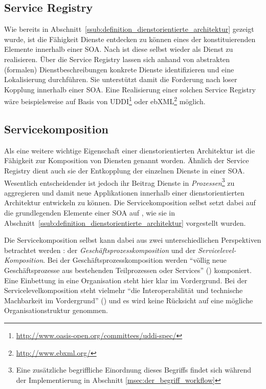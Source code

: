 \subsection{Service Registry} %
\label{sub:service_registry}

  Wie bereits in Abschnitt~\ref{ssub:definition_dienstorientierte_architektur} gezeigt wurde, ist die Fähigkeit Dienste entdecken zu können eines der konstituierenden Elemente innerhalb einer SOA. Nach \citep{service_oriented_computing} ist diese selbst wieder als Dienst zu realisieren. Über die Service Registry lassen sich anhand von abstrakten (formalen) Dienstbeschreibungen konkrete Dienste identifizieren und eine Lokalisierung durchführen. Sie unterstützt damit die Forderung nach loser Kopplung innerhalb einer SOA. Eine Realisierung einer solchen Service Registry wäre beispielsweise auf Basis von UDDI\footnote{\url{http://www.oasis-open.org/committees/uddi-spec/}} oder ebXML\footnote{\url{http://www.ebxml.org/}} möglich.


\subsection{Servicekomposition} %
\label{sub:service_komposition}

  Als eine weitere wichtige Eigenschaft einer dienstorientierten Architektur ist die Fähigkeit zur Komposition von Diensten genannt worden. Ähnlich der Service Registry dient auch sie der Entkopplung der einzelnen Dienste in einer SOA. Wesentlich entscheidender ist jedoch ihr Beitrag Dienste in \emph{Prozessen}\footnote{Eine zusätzliche begriffliche Einordnung dieses Begriffs findet sich während der Implementierung in Abschnitt \ref{msec:der_begriff_workflow}} zu aggregieren und damit neue Applikationen innerhalb einer dienstorientierten Architektur entwickeln zu können. Die Servicekomposition selbst setzt dabei auf die grundlegenden Elemente einer SOA auf \citep[S. 51]{milanovic2004csw}, wie sie in Abschnitt~\ref{ssub:definition_dienstorientierte_architektur} vorgestellt wurden.
    
  Die Servicekomposition selbst kann dabei aus zwei unterschiedlichen Perspektiven betrachtet werden \citep[S. 104]{masak2007ssb}: der \emph{Geschäftsprozesskomposition} und der \emph{Servicelevel-Komposition}. Bei der Geschäftsprozesskomposition werden "`völlig neue Geschäftsprozesse aus bestehenden Teilprozessen oder Services"' (\citep[S. 104]{masak2007ssb}) komponiert. Eine Einbettung in eine Organisation steht hier klar im Vordergrund. Bei der Servicelevelkomposition steht vielmehr "`die Interoperabilität und technische Machbarkeit im Vordergrund"' (\citep[S. 105]{masak2007ssb}) und es wird keine Rücksicht auf eine mögliche Organisationstruktur genommen.
  
